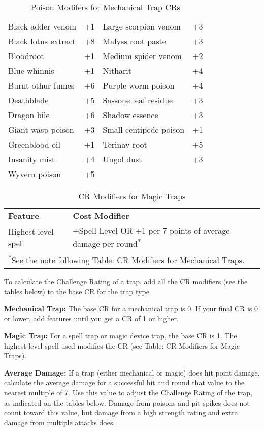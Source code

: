 \begin{table}[htb]
\caption{Poison Modifers for Mechanical Trap CRs}
\centering
\begin{tabular}{l c l c}
Black adder venom &+1 &Large scorpion venom &+3\\
Black lotus extract &+8 &Malyss root paste &+3\\
Bloodroot &+1 &Medium spider venom &+2\\
Blue whinnis &+1 &Nitharit &+4\\
Burnt othur fumes &+6 &Purple worm poison &+4\\
Deathblade &+5 &Sassone leaf residue &+3\\
Dragon bile &+6 &Shadow essence &+3\\
Giant wasp poison &+3 &Small centipede poison &+1\\
Greenblood oil &+1 &Terinav root &+5\\
Insanity mist &+4 &Ungol dust &+3\\
Wyvern poison &+5 & &\\
\end{tabular}
\end{table}

\begin{table}[htb]
\caption{CR Modifiers for Magic Traps}
\centering
\begin{tabular}{l l}
\textbf{Feature} & \textbf{Cost Modifier}\\
Highest-level spell & +Spell Level OR +1 per 7 points of average damage per round\textsuperscript{*}\\
\multicolumn{2}{l}{\textsuperscript{*}See the note following Table: CR Modifiers for Mechanical Traps.}\\
\end{tabular}
\end{table}

To calculate the Challenge Rating of a trap, add all the CR modifiers (see the 
tables below) to the base CR for the trap type.

\textbf{Mechanical Trap:} The base CR for a mechanical trap is 0. If your final 
CR is 0 or lower, add features until you get a CR of 1 or higher.

\textbf{Magic Trap:} For a spell trap or magic device trap, the base CR is 1. The 
highest-level spell used modifies the CR (see Table: CR Modifiers for Magic Traps).

\textbf{Average Damage:} If a trap (either mechanical or magic) does hit point 
damage, calculate the average damage for a successful hit and round that value 
to the nearest multiple of 7. Use this value to adjust the Challenge Rating of 
the trap, as indicated on the tables below. Damage from poisons and pit spikes 
does not count toward this value, but damage from a high strength rating and extra 
damage from multiple attacks does.

